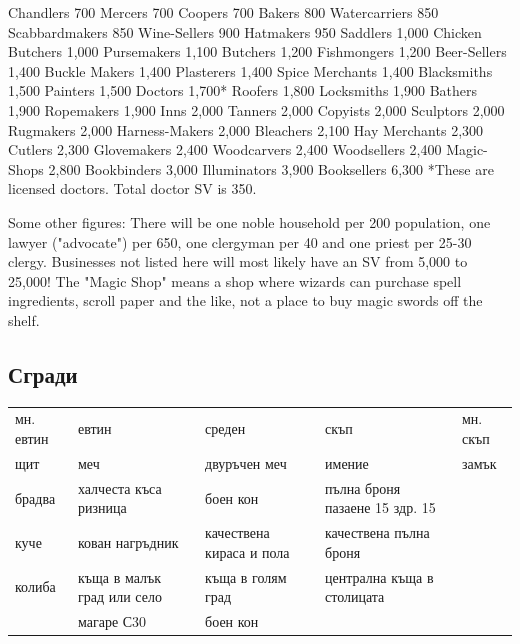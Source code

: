 Chandlers     700
Mercers     700
Coopers     700
Bakers                   800
Watercarriers     850
Scabbardmakers   850
Wine-Sellers     900
Hatmakers     950
Saddlers     1,000
Chicken Butchers  1,000
Pursemakers     1,100
Butchers     1,200
Fishmongers     1,200
Beer-Sellers     1,400
Buckle Makers     1,400
Plasterers     1,400
Spice Merchants   1,400
Blacksmiths     1,500
Painters     1,500
Doctors                   1,700*
Roofers       1,800
Locksmiths     1,900
Bathers                   1,900
Ropemakers     1,900
Inns                   2,000
Tanners                   2,000
Copyists    2,000
Sculptors    2,000
Rugmakers    2,000
Harness-Makers  2,000
Bleachers    2,100
Hay Merchants    2,300
Cutlers                  2,300
Glovemakers   2,400
Woodcarvers   2,400
Woodsellers   2,400
Magic-Shops   2,800
Bookbinders   3,000
Illuminators   3,900
Booksellers   6,300
*These are licensed doctors. Total doctor SV is 350.

Some other figures: There will be one noble household per 200 population, one lawyer ("advocate") per 650, one clergyman per 40 and one priest per 25-30 clergy. Businesses not listed here will most likely have an SV from 5,000 to 25,000! The "Magic Shop" means a shop where wizards can purchase spell ingredients, scroll paper and the like, not a place to buy magic swords off the shelf. 

\subsection{Сгради}
\begin{tabular}{p{3cm} | p{3cm} | p{3cm} | p{3cm} | p{3cm}}
мн. евтин & евтин                                   & среден                   & скъп                           & мн. скъп  \\
щит       & меч                                     & двуръчен меч             & имение                         & замък     \\
брадва    & халчеста къса ризница                   & боен кон                 & пълна броня пазаене 15 здр. 15 &           \\
куче      & кован нагръдник                         & качествена кираса и пола & качествена пълна броня         &           \\
колиба    & къща в малък град или село              & къща в голям град        & централна къща в столицата                 \\
          & магаре С30                              & боен кон                 &
\end{tabular}

